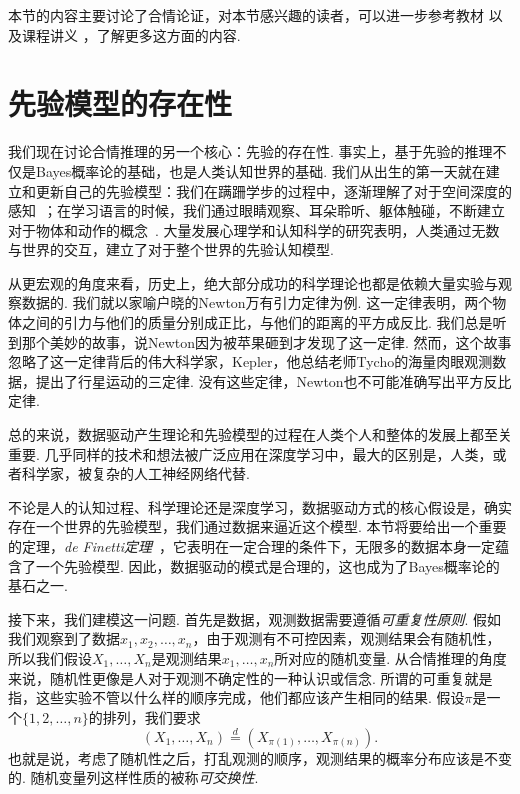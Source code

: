 \begin{remark}
    本节的内容主要讨论了合情论证，对本节感兴趣的读者，可以进一步参考教材 \cite{skyrmsChoiceChanceIntroduction1975} 以及课程讲义 \cite{pacuitReasoningHumansClear}，了解更多这方面的内容. 
\end{remark}

\section{先验模型的存在性}

我们现在讨论合情推理的另一个核心：先验的存在性. 事实上，基于先验的推理不仅是Bayes概率论的基础，也是人类认知世界的基础. 我们从出生的第一天就在建立和更新自己的先验模型：我们在蹒跚学步的过程中，逐渐理解了对于空间深度的感知~\cite{walkComparativeAnalyticalStudy1961}；在学习语言的时候，我们通过眼睛观察、耳朵聆听、躯体触碰，不断建立对于物体和动作的概念~\cite{vongGroundedLanguageAcquisition2024,saffranStatisticalLearning8MonthOld1996}. 大量发展心理学和认知科学的研究表明，人类通过无数与世界的交互，建立了对于整个世界的先验认知模型.

从更宏观的角度来看，历史上，绝大部分成功的科学理论也都是依赖大量实验与观察数据的. 我们就以家喻户晓的Newton万有引力定律为例. 这一定律表明，两个物体之间的引力与他们的质量分别成正比，与他们的距离的平方成反比. 我们总是听到那个美妙的故事，说Newton因为被苹果砸到才发现了这一定律. 然而，这个故事忽略了这一定律背后的伟大科学家，Kepler，他总结老师Tycho的海量肉眼观测数据，提出了行星运动的三定律. 没有这些定律，Newton也不可能准确写出平方反比定律. 

总的来说，数据驱动产生理论和先验模型的过程在人类个人和整体的发展上都至关重要. 几乎同样的技术和想法被广泛应用在深度学习中，最大的区别是，人类，或者科学家，被复杂的人工神经网络代替. 

不论是人的认知过程、科学理论还是深度学习，数据驱动方式的核心假设是，确实存在一个世界的先验模型，我们通过数据来逼近这个模型. 本节将要给出一个重要的定理，\textit{de Finetti定理}~\cite{diaconisFiniteExchangeableSequences1980,kernsDefinettisTheoremAbstract2006,durrettProbabilityTheoryExamples2019}，它表明在一定合理的条件下，无限多的数据本身一定蕴含了一个先验模型. 因此，数据驱动的模式是合理的，这也成为了Bayes概率论的基石之一.

接下来，我们建模这一问题. 首先是数据，观测数据需要遵循\textit{可重复性原则}. 假如我们观察到了数据$x_1,x_2,\dots,x_n$，由于观测有不可控因素，观测结果会有随机性，所以我们假设$X_1,\dots,X_n$是观测结果$x_1,\dots,x_n$所对应的随机变量. 从合情推理的角度来说，随机性更像是人对于观测不确定性的一种认识或信念. 所谓的可重复就是指，这些实验不管以什么样的顺序完成，他们都应该产生相同的结果. 假设$\pi$是一个$\{1,2,\dots,n\}$的排列，我们要求
\[
    (X_1,\dots,X_n)\stackrel{d}{=}(X_{\pi(1)},\dots,X_{\pi(n)}).
\]
也就是说，考虑了随机性之后，打乱观测的顺序，观测结果的概率分布应该是不变的. 随机变量列这样性质的被称\textit{可交换性}. 

